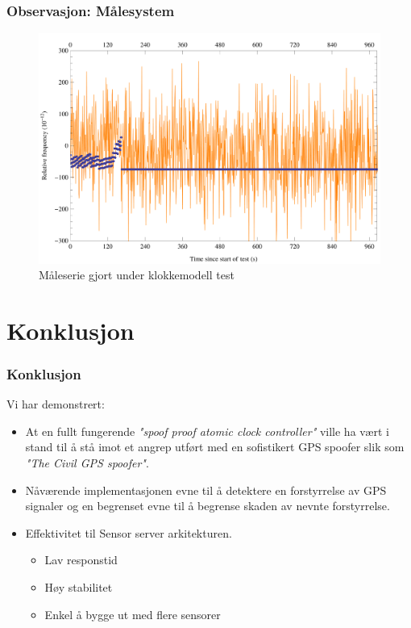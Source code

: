 \documentclass[xcolor=table]{beamer}
\begin{document}
\begin{frame}
\frametitle{Observasjon: Målesystem}
      \begin{figure}
        \includegraphics[scale=0.70]{thesis/graphics/20161024-test2-telemetry-and-cnt91-combined-1-2.png}
        \caption{Måleserie gjort under klokkemodell test}
      \end{figure}
\end{frame}

\section{Konklusjon}
\begin{frame}
  \frametitle{Konklusjon}
  Vi har demonstrert:
  \begin{itemize}
    \item At en fullt fungerende \textit{"spoof proof atomic clock controller"} ville ha vært i stand til å stå imot et angrep utført med en sofistikert GPS spoofer slik som \textit{"The Civil GPS spoofer"}.
    \item Nåværende implementasjonen evne til å detektere en forstyrrelse av GPS signaler og en begrenset evne til å begrense skaden av nevnte forstyrrelse.
    \item Effektivitet til Sensor server arkitekturen. 
    \begin{itemize}
      \item Lav responstid
      \item Høy stabilitet 
      \item Enkel å bygge ut med flere sensorer
    \end{itemize}
  \end{itemize}
\end{frame}
\end{document}
